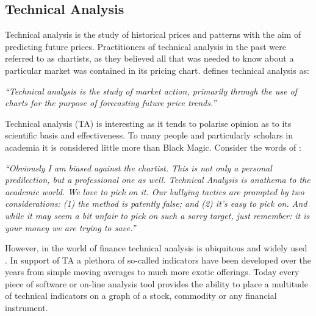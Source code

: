 \subsection{Technical Analysis}
\label{chp1:ta}
Technical analysis is the study of historical prices and patterns with the aim of predicting future prices. Practitioners of technical analysis in the past were referred to as chartists, as they believed all that was needed to know about a particular market was contained in its pricing chart. \cite{murphy1999technical} defines technical analysis as:


\textit{\textquotedblleft Technical analysis is the study of market action, primarily through the use of charts for the purpose of forecasting future price trends.\textquotedblright}

Technical analysis (TA) is interesting as it tends to polarise opinion as to its scientific basis and effectiveness. To many people and particularly scholars in academia it is considered little more than Black Magic. Consider the words of \cite{malkiel1999random}:

\textit{\textquotedblleft Obviously I am biased against the chartist. This is not only a personal predilection, but a professional one as well. Technical Analysis is anathema to the academic world. We love to pick on it. Our bullying tactics are prompted by two considerations: (1) the method is patently false; and (2) it's easy to pick on. And while it may seem a bit unfair to pick on such a sorry target, just remember: it is your money we are trying to save.\textquotedblright}

However, in the world of finance technical analysis is ubiquitous and widely used \citep{Menkhoff20102573}. In support of TA a plethora of so-called indicators have been developed over the years from simple moving averages to much more exotic offerings. Today every piece of software or on-line analysis tool provides the ability to place a multitude of technical indicators on a graph of a stock, commodity or any financial instrument.

